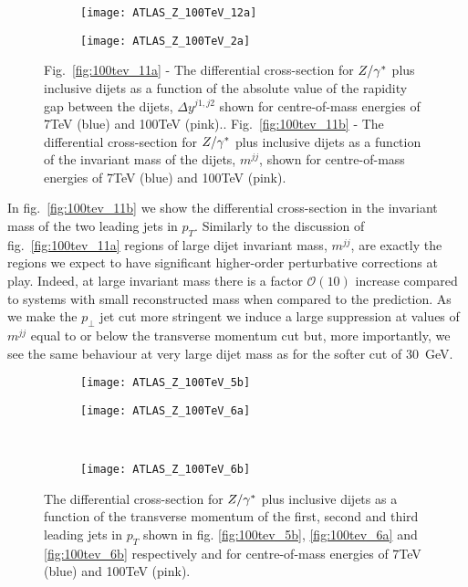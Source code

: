 	\begin{figure}[bth]
		\centering
		\begin{subfigure}[b]{0.49\textwidth}
			\texttt{[image: ATLAS\_Z\_100TeV\_12a]}
			\caption{}
			\label{fig:100tev_11a}
		\end{subfigure}
		\begin{subfigure}[b]{0.49\textwidth}
			\texttt{[image: ATLAS\_Z\_100TeV\_2a]}
			\caption{}
			\label{fig:100tev_11b}
		\end{subfigure}
		\caption{Fig.~\eqref{fig:100tev_11a} - The differential cross-section for $Z/\gamma^*$ plus inclusive dijets as a function
		of the absolute value of the rapidity gap between the dijets, $\Delta y^{j1, j2}$ shown for centre-of-mass energies
		of 7TeV (blue) and 100TeV (pink).. Fig.~\eqref{fig:100tev_11b} - The differential cross-section for $Z/\gamma^*$ plus
		inclusive dijets as a function of the invariant mass of the dijets, $m^{jj}$, shown for centre-of-mass energies
		of 7TeV (blue) and 100TeV (pink).}
	\end{figure}

	In fig.~\eqref{fig:100tev_11b} we show the differential cross-section in the invariant mass of the two leading
	jets in $p_T$.  Similarly to the discussion of fig.~\eqref{fig:100tev_11a} regions of large dijet invariant mass,
	$m^{jj}$, are exactly the regions we expect to have significant higher-order perturbative corrections at play.
	Indeed, at large invariant mass there is a factor $\mathcal{O}(10)$ increase compared to systems with small
	reconstructed mass when compared to the \stev prediction.  As we make the $p_\perp$ jet cut more stringent
	we induce a large suppression at values of $m^{jj}$ equal to or below the transverse momentum cut but, more
	importantly, we see the same behaviour at very large dijet mass as for the softer cut of 30~GeV.

	\begin{figure}[bth]
		\centering
		\begin{subfigure}[b]{0.48\textwidth}
			\texttt{[image: ATLAS\_Z\_100TeV\_5b]}
			\caption{}
			\label{fig:100tev_5b}
		\end{subfigure}

		\begin{subfigure}[b]{0.48\textwidth}
			\texttt{[image: ATLAS\_Z\_100TeV\_6a]}
			\caption{}
			\label{fig:100tev_6a}
		\end{subfigure}
		~
		\begin{subfigure}[b]{0.48\textwidth}
			\texttt{[image: ATLAS\_Z\_100TeV\_6b]}
			\caption{}
			\label{fig:100tev_6b}
		\end{subfigure}
		\caption{The differential cross-section for $Z/\gamma^*$ plus inclusive dijets as a function of the transverse momentum
		         of the first, second and third leading jets in $p_T$ shown in fig. \eqref{fig:100tev_5b}, \eqref{fig:100tev_6a}
		         and \eqref{fig:100tev_6b} respectively and for centre-of-mass energies of 7TeV (blue) and 100TeV (pink).}
	\end{figure}

